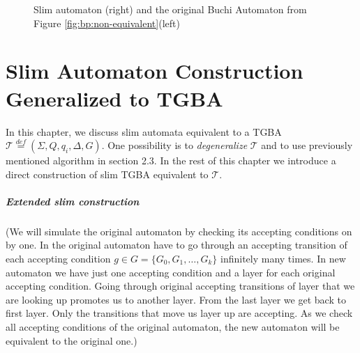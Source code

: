 \documentclass[
	digital
nolof, nolot
]{fithesis3}
\newcommand{\cT}{\mathcal{T}}
\newcommand{\eqdef}{\overset{def}{=}}
\newcommand{\flushed}{\text{\emoji{flushed}}}
\newcommand{\hell}{\text{\emoji{fire}}}
\newcommand{\heaven}{\text{\emoji{innocent}}}
\begin{document}
			\begin{figure}[ht]
				\begin{center}
				\end{center}
				\caption{Slim automaton (right) and the original Buchi Automaton from Figure \ref{fig:bp:non-equivalent}(left)}
				\label{fig:slim:equivalent}
			\end{figure}

			
			\chapter{Slim Automaton Construction Generalized to TGBA} \label{section:gslim}
			In this chapter, we discuss slim automata equivalent to a TGBA $\cT\eqdef(\Sigma, Q, q_i, \Delta, G)$.
			One possibility is to \emph{degeneralize} $\cT$ and to use previously mentioned algorithm in section 2.3.
			In the rest of this chapter we introduce a direct construction of slim TGBA equivalent to $\cT$.
			\paragraph{Extended slim construction}
			(We will simulate the original automaton by checking its accepting conditions on by one. In the original automaton have to go through an accepting transition of each accepting condition $g \in G=\{G_0, G_1, \ldots, G_k\}$ infinitely many times. In new automaton we have just one accepting condition and a layer for each original accepting condition. Going through original accepting transitions of layer that we are looking up promotes us to another layer. From the last layer we get back to first layer. Only the transitions that move us layer up are accepting. As we check all accepting conditions of the original automaton, the new automaton will be equivalent to the original one.)
			
\end{document}
